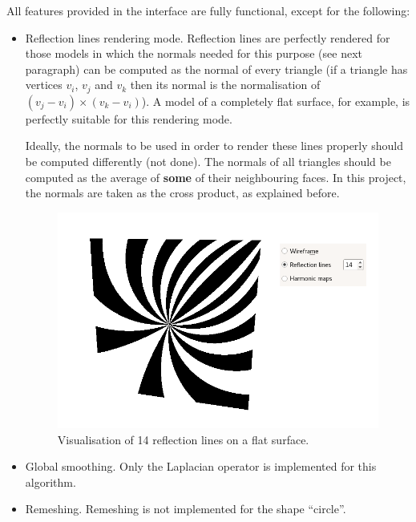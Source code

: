 \documentclass[12pt]{article}
\begin{document}
All features provided in the interface are fully functional, except for
the following:
\begin{itemize}
	\item Reflection lines rendering mode. Reflection lines are perfectly
	rendered for those models in which the normals needed for this purpose
	(see next paragraph) can be computed as the normal of every triangle
	(if a triangle has vertices $v_i$, $v_j$ and $v_k$ then its normal is
	the normalisation of $(v_j - v_i) \times (v_k - v_i)$). A model of a
	completely flat surface, for example, is perfectly suitable for this
	rendering mode.
	\hfill
	
	Ideally, the normals to be used in order to render these lines
	properly should be computed differently (not done). The normals of all
	triangles should be computed as the average of \textbf{some} of their
	neighbouring faces. In this project, the normals are taken as the cross
	product, as explained before.
	
	\begin{figure}[H]
		\centering
		\includegraphics[scale=1.6]{reflection-lines}
		\caption{Visualisation of 14 reflection lines on a flat surface.}
	\end{figure}
	
	\item Global smoothing. Only the Laplacian operator is implemented
	for this algorithm.
	
	\item Remeshing. Remeshing is not implemented for the shape ``circle''.
\end{itemize}
\end{document}
